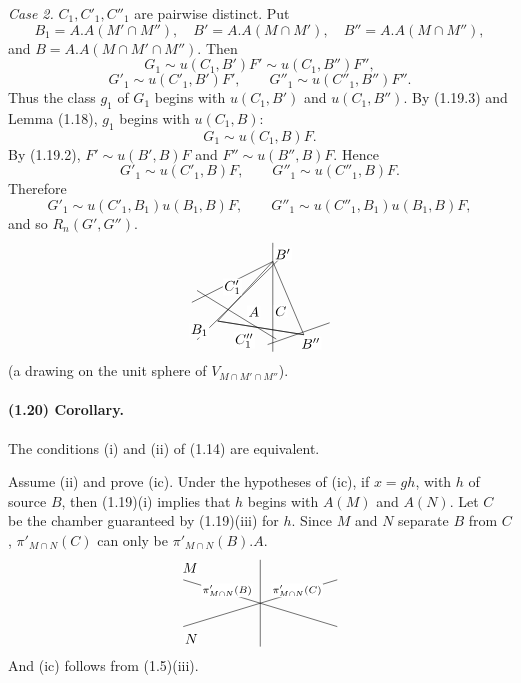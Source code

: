 \documentclass[10pt]{article}
\begin{document}
\emph{Case 2.} $C_1,C'_1,C''_1$ are pairwise distinct. Put
\[
B_1=A.A(M'\cap M''),\quad B'=A.A(M\cap M'),\quad
B''=A.A(M\cap M''),
\]
and $B=A.A(M\cap M'\cap M'')$. Then
\[
G_1\sim u(C_1,B')F'\sim u(C_1,B'')F'',
\]
\[
G'_1\sim u(C'_1,B')F',\qquad
G''_1\sim u(C''_1,B'')F''.
\]
Thus the class $g_1$ of $G_1$ begins with $u(C_1,B')$ and $u(C_1,B'')$. By (1.19.3) and Lemma (1.18), $g_1$ begins with $u(C_1,B)$:
\[
G_1\sim u(C_1,B)F.
\]
By (1.19.2), $F'\sim u(B',B)F$ and $F''\sim u(B'',B)F$. Hence
\[
G'_1\sim u(C'_1,B)F,\qquad G''_1\sim u(C''_1,B)F.
\]
Therefore
\[
G'_1\sim u(C'_1,B_1)u(B_1,B)F,
\qquad
G''_1\sim u(C''_1,B_1)u(B_1,B)F,
\]
and so $R_n(G',G'')$.
\[
\begin{tikzpicture}[scale=0.86,baseline={(0,0)}]
\coordinate (L) at (-1.25,-0.65);
\coordinate (T) at (0.35,1.10);
\coordinate (R) at (1.25,-1.05);
\draw (L)--(T)--(R)--cycle;
\draw (L)--(R);
\draw (0.35,1.65)--(0.35,-1.55);
\draw (-1.85,-1.20)--(0.85,1.48);
\draw (-2.0,-0.10)--(0.35,1.10);
\draw (-1.85,0.25)--(0.45,-1.18);
\draw (0.20,-1.34)--(2.00,-0.70);
\node[fill=white,inner sep=1pt] at (-1.78,-0.92) {$B_1$};
\node[fill=white,inner sep=1pt] at (-0.82,0.35) {$C'_1$};
\node[fill=white,inner sep=1pt] at (-0.48,-1.22) {$C''_1$};
\node[fill=white,inner sep=1pt] at (-0.20,-0.38) {$A$};
\node[fill=white,inner sep=1pt] at (0.58,-0.36) {$C$};
\node[fill=white,inner sep=1pt] at (0.64,1.32) {$B'$};
\node[fill=white,inner sep=1pt] at (1.45,-1.30) {$B''$};
\end{tikzpicture}
\]
(a drawing on the unit sphere of $V_{M\cap M'\cap M''}$).

\paragraph{(1.20) Corollary.} The conditions (i) and (ii) of (1.14) are equivalent.

Assume (ii) and prove (ic). Under the hypotheses of (ic), if $x=gh$, with $h$ of source $B$, then (1.19)(i) implies that $h$ begins with $A(M)$ and $A(N)$. Let $C$ be the chamber guaranteed by (1.19)(iii) for $h$. Since $M$ and $N$ separate $B$ from $C$, $\pi'_{M\cap N}(C)$ can only be $\pi'_{M\cap N}(B).A$.
\[
\begin{tikzpicture}[scale=0.95,baseline={(0,0)}]
\draw (-2.05,0.62)--(2.05,-0.62);
\draw (-2.05,-0.62)--(2.05,0.62);
\draw (0,-1.15)--(0,1.15);
\node[fill=white,inner sep=1pt,above left] at (-1.62,0.77) {$M$};
\node[fill=white,inner sep=1pt,below left] at (-1.62,-0.77) {$N$};
\node[fill=white,inner sep=1pt,above] at (-0.88,0.15) {$\scriptstyle\pi'_{M\cap N}(B)$};
\node[fill=white,inner sep=1pt,above] at (0.98,0.15) {$\scriptstyle\pi'_{M\cap N}(C)$};
\end{tikzpicture}
\]
And (ic) follows from (1.5)(iii).
\end{document}
